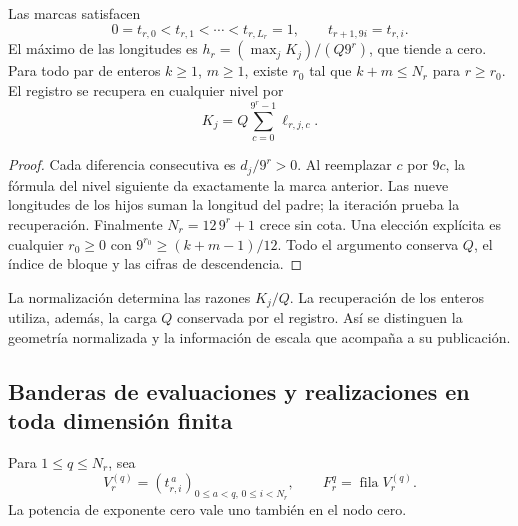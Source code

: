 \begin{proposition}
\label{prop:dim-grid}
Las marcas satisfacen
\[
 0=t_{r,0}<t_{r,1}<\cdots<t_{r,L_r}=1,
 \qquad t_{r+1,9i}=t_{r,i}.
\]
El máximo de las longitudes es
\(h_r=(\max_jK_j)/(Q9^r)\), que tiende a cero. Para todo par de
enteros \(k\geq1\), \(m\geq1\), existe \(r_0\) tal que
\(k+m\leq N_r\) para \(r\geq r_0\). El registro se recupera en
cualquier nivel por
\[
 K_j=Q\sum_{c=0}^{9^r-1}\ell_{r,j,c}.
\]
\end{proposition}
\begin{proof}
Cada diferencia consecutiva es \(d_j/9^r>0\). Al reemplazar \(c\)
por \(9c\), la fórmula del nivel siguiente da exactamente la marca
anterior. Las nueve longitudes de los hijos suman la longitud del padre;
la iteración prueba la recuperación. Finalmente \(N_r=12\,9^r+1\)
crece sin cota. Una elección explícita es cualquier \(r_0\geq0\) con
\(9^{r_0}\geq(k+m-1)/12\). Todo el argumento conserva \(Q\), el
índice de bloque y las cifras de descendencia.
\end{proof}

La normalización determina las razones \(K_j/Q\). La recuperación de
los enteros utiliza, además, la carga \(Q\) conservada por el registro.
Así se distinguen la geometría normalizada y la información de escala
que acompaña a su publicación.

\subsection{Banderas de evaluaciones y realizaciones en toda dimensión finita}

Para \(1\leq q\leq N_r\), sea
\[
 V_r^{(q)}=(t_{r,i}^{\,a})_{0\leq a<q,\,0\leq i<N_r},
 \qquad F_r^q=\operatorname{fila}V_r^{(q)}.
\]
La potencia de exponente cero vale uno también en el nodo cero.

